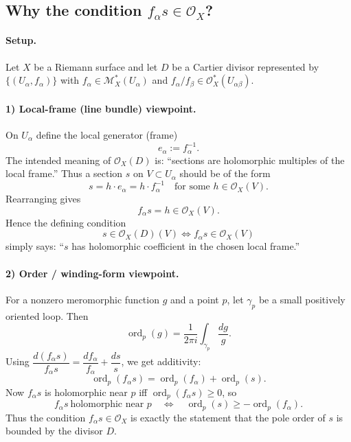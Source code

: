\documentclass[11pt,openany]{article}
\newcommand{\ord}{\operatorname{ord}}
\begin{document}
\newpage

\subsection*{Why the condition $f_\alpha s\in \mathcal O_X$?}

\paragraph{Setup.}
Let $X$ be a Riemann surface and let $D$ be a Cartier divisor represented by
$\{(U_\alpha,f_\alpha)\}$ with $f_\alpha\in\mathcal M_X^*(U_\alpha)$ and
$f_\alpha/f_\beta\in\mathcal O_X^*(U_{\alpha\beta})$.

\paragraph{1) Local-frame (line bundle) viewpoint.}
On $U_\alpha$ define the local generator (frame)
\[
e_\alpha := f_\alpha^{-1}.
\]
The intended meaning of $\mathcal O_X(D)$ is: ``sections are holomorphic multiples of the local frame.''
Thus a section $s$ on $V\subset U_\alpha$ should be of the form
\[
s = h\cdot e_\alpha = h\cdot f_\alpha^{-1}
\quad\text{for some } h\in \mathcal O_X(V).
\]
Rearranging gives
\[
f_\alpha s = h\in\mathcal O_X(V).
\]
Hence the defining condition
\[
s\in\mathcal O_X(D)(V)\iff f_\alpha s\in\mathcal O_X(V)
\]
simply says: ``$s$ has holomorphic coefficient in the chosen local frame.''

\paragraph{2) Order / winding-form viewpoint.}
For a nonzero meromorphic function $g$ and a point $p$, let $\gamma_p$ be a small positively oriented loop.
Then
\[
\ord_p(g)=\frac{1}{2\pi i}\int_{\gamma_p}\frac{dg}{g}.
\]
Using $\dfrac{d(f_\alpha s)}{f_\alpha s}=\dfrac{df_\alpha}{f_\alpha}+\dfrac{ds}{s}$, we get additivity:
\[
\ord_p(f_\alpha s)=\ord_p(f_\alpha)+\ord_p(s).
\]
Now $f_\alpha s$ is holomorphic near $p$ iff $\ord_p(f_\alpha s)\ge 0$, so
\[
f_\alpha s\ \text{holomorphic near }p
\quad\Longleftrightarrow\quad
\ord_p(s)\ge -\ord_p(f_\alpha).
\]
Thus the condition $f_\alpha s\in\mathcal O_X$ is exactly the statement that the pole order of $s$
is bounded by the divisor $D$.
\end{document}
